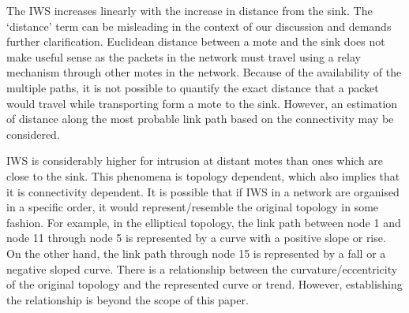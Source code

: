 \documentclass[conference,final]{IEEEtran}
\begin{document}
The IWS increases linearly with the increase in distance from the sink.
The `distance' term can be misleading in the context of our discussion and demands further clarification.
Euclidean distance between a mote and the sink does not make useful sense as the packets in the network must travel using a relay mechanism through other motes in the network.
Because of the availability of the multiple paths, it is not possible to quantify the exact distance that a packet would travel while transporting form a mote to the sink.
However, an estimation of distance along the most probable link path based on the connectivity may be considered.

IWS is considerably higher for intrusion at distant motes than ones which are close to the sink.
This phenomena is topology dependent, which also implies   that it is connectivity dependent.
It is possible that if IWS in a network are organised in a specific order, it would represent/resemble   the original topology in some fashion.
For example, in the elliptical topology, the link path between node 1 and node 11 through node 5 is represented by a curve with a positive slope or rise.
On the other hand, the link path through node 15 is represented by a fall or a negative sloped curve.
There is a relationship between the curvature/eccentricity of the original topology and the represented curve or  trend.
However, establishing the relationship is beyond the scope of this paper.

\end{document}
